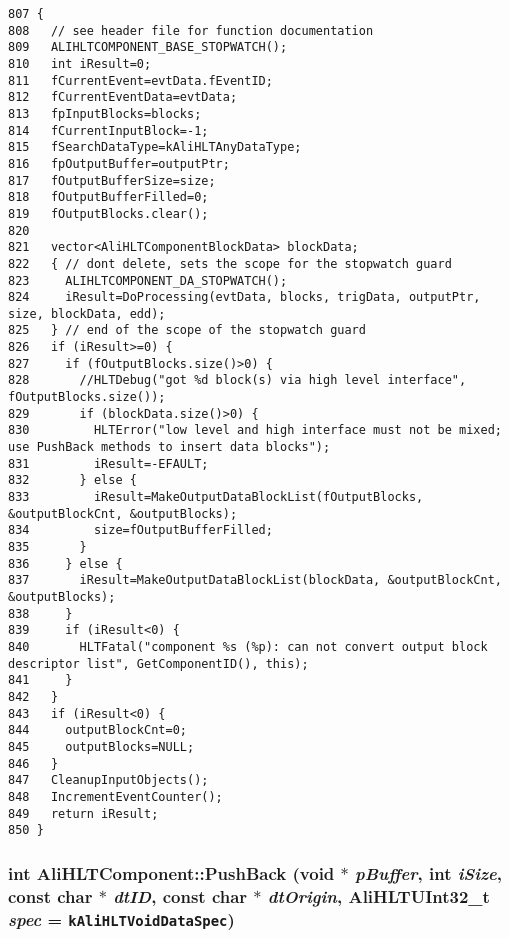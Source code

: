 \footnotesize\begin{verbatim}807 {
808   // see header file for function documentation
809   ALIHLTCOMPONENT_BASE_STOPWATCH();
810   int iResult=0;
811   fCurrentEvent=evtData.fEventID;
812   fCurrentEventData=evtData;
813   fpInputBlocks=blocks;
814   fCurrentInputBlock=-1;
815   fSearchDataType=kAliHLTAnyDataType;
816   fpOutputBuffer=outputPtr;
817   fOutputBufferSize=size;
818   fOutputBufferFilled=0;
819   fOutputBlocks.clear();
820   
821   vector<AliHLTComponentBlockData> blockData;
822   { // dont delete, sets the scope for the stopwatch guard
823     ALIHLTCOMPONENT_DA_STOPWATCH();
824     iResult=DoProcessing(evtData, blocks, trigData, outputPtr, size, blockData, edd);
825   } // end of the scope of the stopwatch guard
826   if (iResult>=0) {
827     if (fOutputBlocks.size()>0) {
828       //HLTDebug("got %d block(s) via high level interface", fOutputBlocks.size());
829       if (blockData.size()>0) {
830         HLTError("low level and high interface must not be mixed; use PushBack methods to insert data blocks");
831         iResult=-EFAULT;
832       } else {
833         iResult=MakeOutputDataBlockList(fOutputBlocks, &outputBlockCnt, &outputBlocks);
834         size=fOutputBufferFilled;
835       }
836     } else {
837       iResult=MakeOutputDataBlockList(blockData, &outputBlockCnt, &outputBlocks);
838     }
839     if (iResult<0) {
840       HLTFatal("component %s (%p): can not convert output block descriptor list", GetComponentID(), this);
841     }
842   }
843   if (iResult<0) {
844     outputBlockCnt=0;
845     outputBlocks=NULL;
846   }
847   CleanupInputObjects();
848   IncrementEventCounter();
849   return iResult;
850 }
\end{verbatim}\normalsize 


\subsubsection{\setlength{\rightskip}{0pt plus 5cm}int Ali\-HLTComponent::Push\-Back (void $\ast$ {\em p\-Buffer}, int {\em i\-Size}, const char $\ast$ {\em dt\-ID}, const char $\ast$ {\em dt\-Origin}, {\bf Ali\-HLTUInt32\_\-t} {\em spec} = {\tt {\bf k\-Ali\-HLTVoid\-Data\-Spec}})\hspace{0.3cm}{\tt  [protected]}}\label{classAliHLTComponent_b26}


